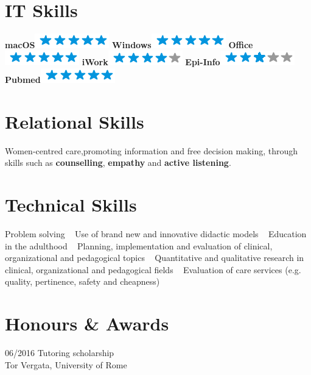 \documentclass[]{friggeri-cv}
\begin{document}
\newpage
\begin{aside}
~
~
~
	\section{IT Skills}
	\textbf{macOS}\includegraphics[scale=0.40]{img/5stars.png}
	\textbf{Windows}\includegraphics[scale=0.40]{img/5stars.png}
	\textbf{Office}\includegraphics[scale=0.40]{img/5stars.png}
	\textbf{iWork}\includegraphics[scale=0.40]{img/4stars.png}
	\textbf{Epi-Info}\includegraphics[scale=0.40]{img/3stars.png}
	\textbf{Pubmed}\includegraphics[scale=0.40]{img/5stars.png}
	~
	\section{Relational Skills}
	Women-centred care,promoting information and free decision making, through skills such as \textbf{counselling}, \textbf{empathy} and \textbf{active listening}.
	~
	\section{Technical Skills}
	Problem solving
	~
	Use of brand new and innovative didactic models
	~
	Education in the adulthood
	~
	Planning, implementation and evaluation of clinical, organizational and pedagogical topics
	~
	Quantitative and qualitative research in clinical, organizational and pedagogical fields
	~
	Evaluation of care services (e.g. quality, pertinence, safety and cheapness)
\end{aside}


\section{Honours \& Awards}
\begin{entrylist}
	\entry
	{06/2016}
	{Tutoring scholarship}
	{\\Tor Vergata, University of Rome}
	{}
	{}
\end{entrylist}
\end{document}
